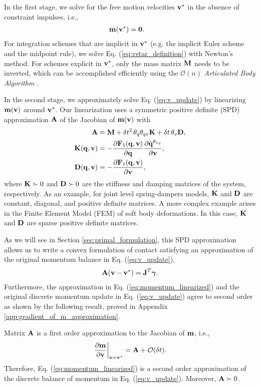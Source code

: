 In the first stage, we solve for the free motion velocities ${\mathbf{v}}^*$ in the
absence of constraint impulses, i.e.,
\begin{align}
	\mf{m}(\mf{v}^*) &= \mf{0}.
	\label{eq:vstar_definition}
\end{align}
For integration schemes that are implicit in ${\mathbf{v}}^*$ (e.g. the implicit Euler
scheme and the midpoint rule), we solve Eq. (\ref{eq:vstar_definition}) with
Newton's method. For schemes explicit in ${\mathbf{v}}^*$, only the mass matrix
${\mathbf{M}}$ needs to be inverted, which can be accomplished efficiently using the
$\mathcal{O}(n)$ \emph{Articulated Body Algorithm}
\cite{bib:featherstone2008_rigid_body_dynamics_algorithms}.

In the second stage, we approximately solve Eq. (\ref{eq:v_update}) by
linearizing ${\mathbf{m}}({\mathbf{v}})$ around ${\mathbf{v}}^*$. Our linearization uses a
symmetric positive definite (SPD) approximation ${\mathbf{A}}$ of the Jacobian
of ${\mathbf{m}}({\mathbf{v}})$ with
\begin{align}
	\mf{A}&=\mf{M}+\delta t^2\,\theta_q\theta_{qv}\mf{K}+\delta t\,\theta_v\mf{D},
	\label{eq:expression_for_A}\\
	\mf{K}(\mf{q}, \mf{v})&=-\frac{\partial \mf{F}_1(\mf{q}, \mf{v})}{\partial
	\mf{q}}\frac{\partial\dot{\mf{q}}^{\theta_{vq}}}{\partial\mf{v}},
	\label{eq:stiffness_matrix}\\
	\mf{D}(\mf{q}, \mf{v})&=-\frac{\partial \mf{F}_1(\mf{q}, \mf{v})}{\partial
	\mf{v}},
	\label{eq:dissipation_matrix}
\end{align}
where ${\mathbf{K}} \succ 0$ and ${\mathbf{D}}\succ 0$ are the stiffness and damping matrices of the
system, respectively. As an example, for joint level spring-dampers models,
${\mathbf{K}}$ and ${\mathbf{D}}$ are constant, diagonal, and positive definite matrices. A
more complex example arises in the Finite Element Model (FEM) of soft body
deformations. In this case, ${\mathbf{K}}$ and ${\mathbf{D}}$ are sparse positive definite
matrices.

As we will see in Section \ref{sec:primal_formulation}, this SPD approximation
allows us to write a convex formulation of contact satisfying an approximation
of the original momentum balance in Eq. (\ref{eq:v_update}),
\begin{align}
	\mf{A}(\mf{v}-\mf{v}^*) = \mf{J}^T\mf{\bgamma}.
	\label{eq:momentum_linearized}
\end{align}
Furthermore, the approximation in Eq. (\ref{eq:momentum_linearized}) and the
original discrete momentum update in Eq. (\ref{eq:v_update}) agree to second
order as shown by the following result, proved in Appendix
\ref{app:gradient_of_m_approximation}.
\begin{prop}	
Matrix ${\mathbf{A}}$ is a first order approximation to the Jacobian of ${\mathbf{m}}$,
i.e.,
\begin{align*}
	\left. \frac{\partial {\mathbf{m}}}{\partial {\mathbf{v}}} \right|_{{\mathbf{v}}={\mathbf{v}}^*} = {\mathbf{A}} + \mathcal{O}(\delta t).
\end{align*}
Therefore, Eq. (\ref{eq:momentum_linearized}) is a second order approximation of
the discrete balance of momentum in Eq. (\ref{eq:v_update}). Moreover, ${\mathbf{A}}
\succ 0$.
\label{prop:gradient_of_m_approximation}
\end{prop}

